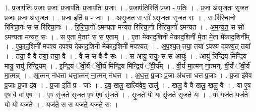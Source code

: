 \documentclass[17pt]{extarticle}
\begin{document}
1. प्र॒जाप॑तिः प्र॒जाः प्र॒जाः प्र॒जाप॑तिः प्र॒जाप॑तिः प्र॒जाः । . प्र॒जाप॑ति॒रिति॑ प्र॒जा - प॒तिः॒ । . प्र॒जा अ॑सृजता सृजत प्र॒जाः प्र॒जा अ॑सृजत । . प्र॒जा इति॑ प्र - जाः । . अ॒सृ॒ज॒त॒ स सो॑ ऽसृजता सृजत॒ सः । . स रि॑रिचा॒नो रि॑रिचा॒नः स स रि॑रिचा॒नः । . रि॒रि॒चा॒नो॑ ऽमन्यता मन्यत रिरिचा॒नो रि॑रिचा॒नो॑ ऽमन्यत । . अ॒म॒न्य॒त॒ स सो॑ ऽमन्यता मन्यत॒ सः । . स ए॒ता मे॒ताꣳ स स ए॒ताम् । . ए॒ता मे॑काद॒शिनी॑ मेकाद॒शिनी॑ मे॒ता मे॒ता मे॑काद॒शिनी᳚म् । . ए॒का॒द॒शिनी॑ मपश्य दपश्य देकाद॒शिनी॑ मेकाद॒शिनी॑ मपश्यत् । . अ॒प॒श्य॒त् तया॒ तया॑ ऽपश्य दपश्य॒त् तया᳚ । . तया॒ वै वै तया॒ तया॒ वै । . वै स स वै वै सः । . स आयु॒ रायुः॒ स स आयुः॑ । . आयु॑ रिन्द्रि॒य मि॑न्द्रि॒य मायु॒ रायु॑ रिन्द्रि॒यम् । . इ॒न्द्रि॒यं ॅवी॒र्यं॑ ॅवी॒र्य॑ मिन्द्रि॒य मि॑न्द्रि॒यं ॅवी॒र्य᳚म् । . वी॒र्य॑ मा॒त्मन् ना॒त्मन्. वी॒र्यं॑ ॅवी॒र्य॑ मा॒त्मन्न् । . आ॒त्मन् न॑धत्ता धत्ता॒त्मन् ना॒त्मन् न॑धत्त । . अ॒ध॒त्त॒ प्र॒जाः प्र॒जा अ॑धत्ता धत्त प्र॒जाः । . प्र॒जा इ॑वेव प्र॒जाः प्र॒जा इ॑व । . प्र॒जा इति॑ प्र - जाः । . इ॒व॒ खलु॒ खल्वि॑वेव॒ खलु॑ । . खलु॒ वै वै खलु॒ खलु॒ वै । . वा ए॒ष ए॒ष वै वा ए॒षः । . ए॒ष सृ॑जते सृजत ए॒ष ए॒ष सृ॑जते । . सृ॒ज॒ते॒ यो यः सृ॑जते सृजते॒ यः । . यो यज॑ते॒ यज॑ते॒ यो यो यज॑ते । . यज॑ते॒ स स यज॑ते॒ यज॑ते॒ सः । \newline
\end{document}
